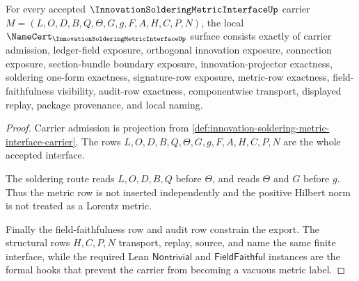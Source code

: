\begin{theorem}
\label{thm:innovation-soldering-metric-interface-namecert-obligations}
For every accepted $\InnovationSolderingMetricInterfaceUp$ carrier $M=(L,O,D,B,Q,\Theta,G,g,F,A,H,C,P,N)$, the local $\NameCert_{\InnovationSolderingMetricInterfaceUp}$ surface consists exactly of carrier admission, ledger-field exposure, orthogonal innovation exposure, connection exposure, section-bundle boundary exposure, innovation-projector exactness, soldering one-form exactness, signature-row exposure, metric-row exactness, field-faithfulness visibility, audit-row exactness, componentwise transport, displayed replay, package provenance, and local naming.
\end{theorem}
\begin{proof}
Carrier admission is projection from \autoref{def:innovation-soldering-metric-interface-carrier}. The rows $L,O,D,B,Q,\Theta,G,g,F,A,H,C,P,N$ are the whole accepted interface.

The soldering route reads $L,O,D,B,Q$ before $\Theta$, and reads $\Theta$ and $G$ before $g$. Thus the metric row is not inserted independently and the positive Hilbert norm is not treated as a Lorentz metric.

Finally the field-faithfulness row and audit row constrain the export. The structural rows $H,C,P,N$ transport, replay, source, and name the same finite interface, while the required Lean $\mathsf{Nontrivial}$ and $\mathsf{FieldFaithful}$ instances are the formal hooks that prevent the carrier from becoming a vacuous metric label.
\end{proof}

